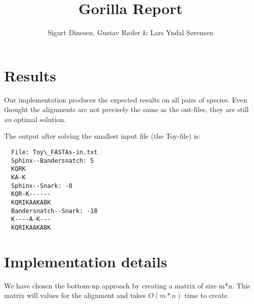 \documentclass{tufte-handout}
\title{Gorilla Report}
\author{Sigurt Dinesen, Gustav Røder \& Lars Yndal Sørensen}
\begin{document}
  \maketitle

  \section{Results}
	Our implementation produces the expected results on all pairs of
	species. Even thought the alignments are not precisely the same as the out-files, they are still \textit{an} optimal solution.
	
	The output after solving the smallest input file (the Toy-file) is:



  \begin{fullwidth}\small
  	\begin{verbatim}
  File: Toy\_FASTAs-in.txt
  Sphinx--Bandersnatch: 5
  KQRK
  KA-K
  Sphinx--Snark: -8
  KQR-K------
  KQRIKAAKABK
  Bandersnatch--Snark: -18
  K----A-K---
  KQRIKAAKABK
   \end{verbatim}
\end{fullwidth}


  \section{Implementation details}
	We have chosen the bottom-up approach by creating a matrix of size m*n. This matrix will values for the alignment and takes $O(m*n)$ time to create.
\end{document}
